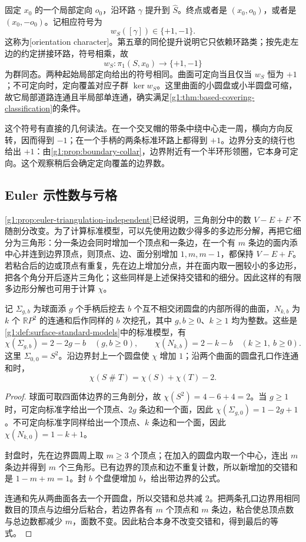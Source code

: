 固定 \(x_0\) 的一个局部定向 \(o_0\)，沿环路 \(\gamma\) 提升到 \(\widehat S\)。终点或者是 \((x_0,o_0)\)，或者是 \((x_0,-o_0)\)。记相应符号为
\[
	w_S([\gamma])\in\{+1,-1\}.
\]
这称为[orientation character]。第五章的同伦提升说明它只依赖环路类；按先走左边的约定拼接环路，符号相乘，故
\[
	w_S:\pi_1(S,x_0)\longrightarrow\{+1,-1\}
\]
为群同态。两种起始局部定向给出的符号相同。曲面可定向当且仅当 \(w_S\) 恒为 \(+1\)；不可定向时，定向覆盖对应子群 \(\ker w_S\)。这里曲面的小圆盘或小半圆盘可缩，故它局部道路连通且半局部单连通，确实满足\cref{g1:thm:based-covering-classification}的条件。

\ProseParagraphBreak

这个符号有直接的几何读法。在一个交叉帽的带条中绕中心走一周，横向方向反转，因而得到 \(-1\)；在一个手柄的两条标准环路上都得到 \(+1\)。边界分支的绕行也给出 \(+1\)：由\cref{g1:prop:boundary-collar}，边界附近有一个半环形领圈，它本身可定向。这个观察稍后会确定定向覆盖的边界数。

\subsection{Euler 示性数与亏格}
\label{g1:subsec:0605:02}

\cref{g1:prop:euler-triangulation-independent}已经说明，三角剖分中的数 \(V-E+F\) 不随剖分改变。为了计算标准模型，可以先使用边数少得多的多边形分解，再把它细分为三角形：分一条边会同时增加一个顶点和一条边，在一个有 \(m\) 条边的面内添中心并连到边界顶点，则顶点、边、面分别增加 \(1,m,m-1\)，都保持 \(V-E+F\)。若粘合后的边或顶点有重复，先在边上增加分点，并在面内取一圈较小的多边形，把各个角分开后逐片三角化；这些同样是上述保持交错和的细分。因此这样的有限多边形分解也可用于计算 \(\chi\)。

\begin{proposition}\label{g1:prop:surface-euler-formulas}
	记 \(\Sigma_{g,b}\) 为球面添 \(g\) 个手柄后挖去 \(b\) 个互不相交闭圆盘的内部所得的曲面，\(N_{k,b}\) 为 \(k\) 个 \(\mathbb RP^2\) 的连通和后作同样的 \(b\) 次挖孔，其中 \(g,b\ge0\)、\(k\ge1\) 均为整数。这些是\cref{g1:def:surface-standard-models}中的标准模型，有
	\[
		\chi(\Sigma_{g,b})=2-2g-b\quad(g,b\ge0),\qquad
		\chi(N_{k,b})=2-k-b\quad(k\ge1,\ b\ge0).
	\]
	这里 \(\Sigma_{0,0}=S^2\)。沿边界封上一个圆盘使 \(\chi\) 增加 \(1\)；沿两个曲面的圆盘孔口作连通和时，
	\[
		\chi(S\mathbin{\#}T)=\chi(S)+\chi(T)-2.
	\]
\end{proposition}
\begin{proof}
	球面可取四面体边界的三角剖分，故 \(\chi(S^2)=4-6+4=2\)。当 \(g\ge1\) 时，可定向标准字给出一个顶点、\(2g\) 条边和一个面，因此 \(\chi(\Sigma_{g,0})=1-2g+1\)。不可定向标准字同样给出一个顶点、\(k\) 条边和一个面，因此 \(\chi(N_{k,0})=1-k+1\)。

	封盘时，先在边界圆周上取 \(m\ge3\) 个顶点；在加入的圆盘内取一个中心，连出 \(m\) 条边并得到 \(m\) 个三角形。已有边界的顶点和边不重复计数，所以新增加的交错和是 \(1-m+m=1\)。封 \(b\) 个盘便增加 \(b\)，给出带边界的公式。

	连通和先从两曲面各去一个开圆盘，所以交错和总共减 \(2\)。把两条孔口边界用相同数目的顶点与边细分后粘合，若边界各有 \(m\) 个顶点和 \(m\) 条边，粘合使总顶点数与总边数都减少 \(m\)，面数不变。因此粘合本身不改变交错和，得到最后的等式。
\end{proof}

